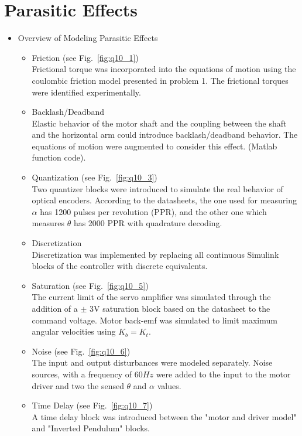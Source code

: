 \documentclass{article}
\theoremstyle{plain}
\theoremstyle{definition}
\theoremstyle{remark}
\begin{document}
\section{Parasitic Effects}
\begin{itemize}
\item Overview of Modeling Parasitic Effects
\begin{itemize}
\item Friction (see Fig.~\ref{fig:q10_1})\\
Frictional torque was incorporated into the equations of motion using the coulombic friction model presented in problem 1.  The frictional torques were identified experimentally.
\item Backlash/Deadband\\
Elastic behavior of the motor shaft and the coupling between the shaft and the horizontal arm could introduce backlash/deadband behavior.  The equations of motion were augmented to consider this effect. (Matlab function code).  
\item Quantization (see Fig.~\ref{fig:q10_3})\\
Two quantizer blocks were introduced to simulate the real behavior of optical encoders. According to the datasheets, the one used for measuring $\alpha$ has 1200 pulses per revolution (PPR), and the other one which measures $\theta$ has 2000 PPR with quadrature decoding.  
\item Discretization\\
Discretization was implemented by replacing all continuous Simulink blocks of the controller with discrete equivalents.  
\item Saturation (see Fig.~\ref{fig:q10_5})\\
The current limit of the servo amplifier was simulated through the addition of a $\pm$ 3V saturation block based on the datasheet to the command voltage.  Motor back-emf was simulated to limit maximum angular velocities using $K_b = K_t$.  
\item Noise (see Fig.~\ref{fig:q10_6})\\
The input and output disturbances were modeled separately. Noise sources, with a frequency of $60 Hz$ were added to the input to the motor driver and two the sensed $\theta$ and $\alpha$ values.  
\item Time Delay (see Fig.~\ref{fig:q10_7})\\
A time delay block was introduced between the "motor and driver model" and "Inverted Pendulum" blocks.    
\end{itemize}


\end{itemize}
\end{document}
